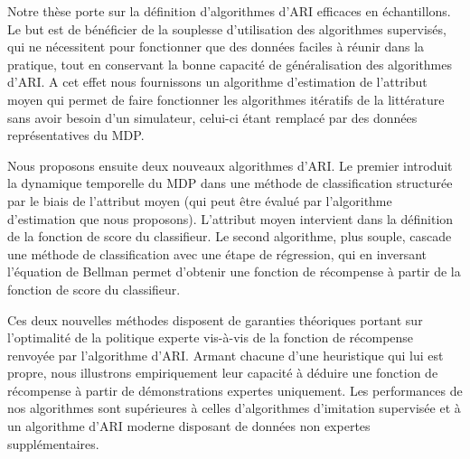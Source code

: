 \documentclass[11pt]{article}
\begin{document}
Notre thèse porte sur la définition d'algorithmes d'ARI efficaces en échantillons. Le but est de bénéficier de la souplesse d'utilisation des algorithmes supervisés, qui ne nécessitent pour fonctionner que des données faciles à réunir dans la pratique, tout en conservant la bonne capacité de généralisation des algorithmes d'ARI. A cet effet nous fournissons un algorithme d'estimation de l'attribut moyen qui permet de faire fonctionner les algorithmes itératifs de la littérature sans avoir besoin d'un simulateur, celui-ci étant remplacé par des données représentatives du MDP.

Nous proposons ensuite deux nouveaux algorithmes d'ARI. Le premier introduit la dynamique temporelle du MDP dans une méthode de classification structurée par le biais de l'attribut moyen (qui peut être évalué par l'algorithme d'estimation que nous proposons). L'attribut moyen intervient dans la définition de la fonction de score du classifieur. Le second algorithme, plus souple, cascade une méthode de classification avec une étape de régression, qui en inversant l'équation de Bellman permet d'obtenir une fonction de récompense à partir de la fonction de score du classifieur.

Ces deux nouvelles méthodes disposent de garanties théoriques portant sur l'optimalité de la politique experte vis-à-vis de la fonction de récompense renvoyée par l'algorithme d'ARI. Armant chacune d'une heuristique qui lui est propre, nous illustrons empiriquement leur capacité à déduire une fonction de récompense à partir de démonstrations expertes uniquement. Les performances de nos algorithmes sont supérieures à celles d'algorithmes d'imitation supervisée et à un algorithme d'ARI moderne disposant de données non expertes supplémentaires. 
\end{document}
